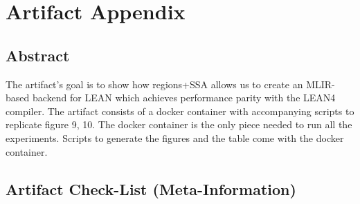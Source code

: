 \documentclass[conference]{IEEEtran}
\begin{document}
\appendix
\section{Artifact Appendix}

\subsection{Abstract}

The artifact’s goal is to show how regions+SSA allows us to
create an MLIR-based backend for LEAN which achieves performance parity
with the LEAN4 compiler. The artifact consists of a docker container with accompanying
scripts to replicate figure  9, 10. The docker container
is the only piece needed to run all the experiments. Scripts to
generate the figures and the table come with the docker container.


\subsection{Artifact Check-List (Meta-Information)}
\end{document}
